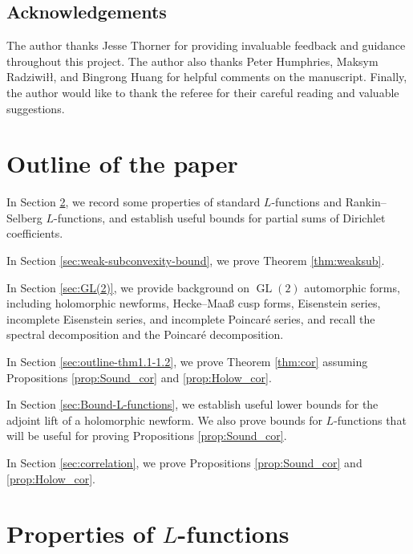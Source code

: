 \documentclass[12pt,reqno]{amsart}
\theoremstyle{remark}
\DeclareMathOperator{\GL}{GL}
\numberwithin{equation}{section}
\begin{document}
    \subsection*{Acknowledgements} 
    The author thanks  Jesse Thorner for providing invaluable feedback and guidance throughout this project. The author also thanks Peter Humphries, Maksym Radziwi\l\l, and Bingrong Huang for helpful  comments on the manuscript. Finally, the author would like to thank the referee for their careful reading and valuable suggestions.
   


    \section{Outline of the paper}

    In Section \ref{sec:L-functions}, we record some properties of standard $L$-functions and Rankin--Selberg $L$-functions, and establish useful bounds for partial sums of Dirichlet coefficients. 
    
    In Section \ref{sec:weak-subconvexity-bound}, we prove Theorem \ref{thm:weaksub}.

    In Section \ref{sec:GL(2)}, we provide background on $\GL(2)$ automorphic forms, including holomorphic newforms, Hecke--Maa{\ss} cusp forms, Eisenstein series, incomplete Eisenstein series, and incomplete Poincar\'e series, and recall the spectral decomposition and the Poincar\'e decomposition.


    In Section \ref{sec:outline-thm1.1-1.2}, we prove Theorem \ref{thm:cor} assuming Propositions  \ref{prop:Sound_cor} and \ref{prop:Holow_cor}.

    In Section \ref{sec:Bound-L-functions}, we establish useful lower bounds for the adjoint lift of a holomorphic newform. We also prove bounds for $L$-functions that will be useful for proving Propositions \ref{prop:Sound_cor}. 
    
    
    In Section \ref{sec:correlation}, we prove Propositions \ref{prop:Sound_cor} and \ref{prop:Holow_cor}. 


    \section{Properties of \texorpdfstring{$L$}{L}-functions}
    \label{sec:L-functions}
\end{document}
